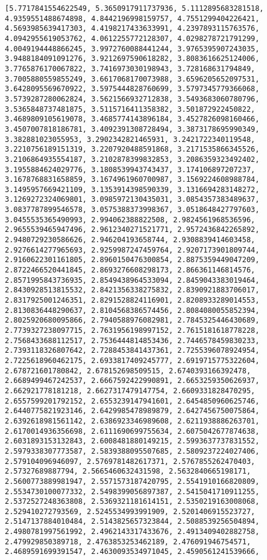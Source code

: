 \documentclass[11pt]{article}
\begin{document}
\begin{Verbatim}[commandchars=\\\{\}]
[5.7717841554622549, 5.3650917911737936, 5.1112895683281518, 4.9359551488674898, 4.8442196998159757, 4.7551299404226421, 4.5693985639417303, 4.4198217433633991, 4.2397893115763576, 4.0942955619053762, 4.0612255772128307, 4.0298278721791299, 4.0049194448866245, 3.9972760088441244, 3.9765395907243035, 3.9488184091091276, 3.9212697590618282, 3.8083616625124006, 3.7765876170067822, 3.7416973030198943, 3.728168631794849, 3.7005880559855249, 3.6617068170073988, 3.6596205652097531, 3.6428095569670922, 3.5975444828760699, 3.5797345779366068, 3.5739287280062824, 3.5621566932712838, 3.5493683060780796, 3.5365848737481875, 3.5115716411358382, 3.501872922450822, 3.4689809105619078, 3.4685774143896184, 3.4527826098160466, 3.4507007818186781, 3.4092391308728494, 3.3873178695990349, 3.382881023055953, 3.2902342821465931, 3.2421722340119548, 3.2210756189151319, 3.2207920488591868, 3.2171535866345526, 3.2106864935554187, 3.2102878399832853, 3.2086359323492402, 3.1955884624029776, 3.1808539943743437, 3.174106897207237, 3.1678768831658859, 3.1674961960700987, 3.1569224608988784, 3.1495957669421109, 3.1353914398590339, 3.1316694283148272, 3.1269272324069801, 3.0985972130435031, 3.0854357383489637, 3.0837787899546578, 3.0575388373998367, 3.0518648427797603, 3.0455535365490993, 2.994062388822508, 2.9824561968536596, 2.9655539465947496, 2.9612340271521771, 2.9572436842265892, 2.9480729230586626, 2.946204193658744, 2.9308839414603458, 2.9276614277965693, 2.9259987247459764, 2.9207173901809744, 2.9160622301161805, 2.8960150476300854, 2.8875359449047209, 2.8722466520441845, 2.8693276608298173, 2.866361146814576, 2.8571995843736935, 2.8549438964533094, 2.8459043383019464, 2.8430928513815532, 2.8421356338275832, 2.8390921883706017, 2.8317925001246351, 2.8291528824116901, 2.8208933289014553, 2.8130836448290637, 2.8104568386574456, 2.8084080055852394, 2.8025920680095866, 2.7940588976082981, 2.7845325446430689, 2.7739327238097715, 2.7631956198997152, 2.7615181618778228, 2.7568433688112517, 2.7536444814853436, 2.7446578459830233, 2.7393118326807642, 2.7288453841437361, 2.7255396078924954, 2.7225618960462175, 2.6933817409245777, 2.6919715775322604, 2.678721601780842, 2.678152698509515, 2.6740393166392478, 2.6689499467242537, 2.6667592422990891, 2.6653259350626937, 2.662921778181218, 2.6627317479147754, 2.6609331828470295, 2.6557599201792152, 2.6553239147941601, 2.6454850960625746, 2.6440775821923146, 2.6429985478989879, 2.6427456750075864, 2.6392618981561142, 2.6386923346989608, 2.6211938886263701, 2.6170014936356698, 2.6111690699755634, 2.6075042677874638, 2.6031893153132843, 2.6008481880149215, 2.5993637737831552, 2.5979338307773587, 2.5839388095507685, 2.5809237224027406, 2.579104096946097, 2.5769781482617371, 2.5767855262470403, 2.57327689887794, 2.5665460632431598, 2.5632840665198171, 2.5600773889981947, 2.5571573187420795, 2.5541910166820809, 2.5534730100077332, 2.5498399056897387, 2.5415041710911255, 2.5372527248363808, 2.5369321181614151, 2.5350219163008068, 2.529410272793569, 2.5245534993991909, 2.5201406915523727, 2.5147137884010484, 2.5143825657323844, 2.5088539256504894, 2.4980781997561992, 2.4962143317433676, 2.4913409402882758, 2.479929850389718, 2.4763853253462189, 2.476091946754571, 2.4689591699391547, 2.4630093534971045, 2.4590561241539666, 
\end{Verbatim}
\end{document}
